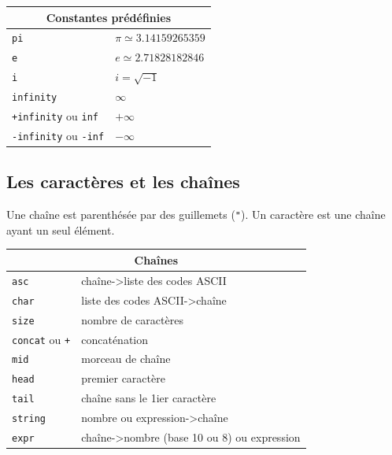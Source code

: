 \documentclass{article}
\begin{document}
\begin{giacjshere}
\begin{center}
\begin{tabular}{|ll|}
\hline
\multicolumn{2}{|c|}{\bf Constantes pr\'ed\'efinies}\\
\hline\hline
\verb|pi|&$\pi\simeq 3.14159265359$ \\
\verb|e|&$e\simeq 2.71828182846$  \\
\verb|i|&$i=\sqrt{-1}$  \\
\verb|infinity|&$\infty$  \\
\verb|+infinity| ou \verb|inf|&$+\infty$  \\
\verb|-infinity| ou \verb|-inf|&$-\infty$  \\
\hline
\end{tabular}
\end{center}
%
\subsection{Les caract\`eres et les cha\^{i}nes}
%
Une cha\^{i}ne est parenth\'es\'ee par des guillemets ({\tt "}).
Un caract\`ere est une cha\^{i}ne ayant un seul \'el\'ement.


\begin{center}
\begin{tabular}{|ll|}
\hline
\multicolumn{2}{|c|}{\bf Cha\^{i}nes}\\
\hline\hline
\verb|asc|&cha\^{i}ne->liste des codes ASCII \\
\verb|char|&liste des codes ASCII->cha\^{i}ne \\
\verb|size|&nombre de caract\`eres \\
\verb|concat| ou \verb|+| &concat\'enation  \\
\verb|mid|&morceau de cha\^{i}ne\\
\verb|head|&premier caract\`ere  \\
\verb|tail|&cha\^{i}ne sans le 1ier caract\`ere\\
\verb|string|&nombre ou expression->cha\^{i}ne  \\
\verb|expr|&cha\^{i}ne->nombre (base 10 ou 8) ou expression  \\
\hline
\end{tabular}
\end{center}%

\end{giacjshere}
\end{document}
